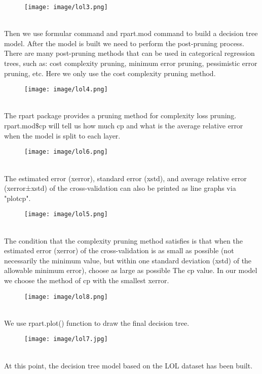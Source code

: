 \documentclass[a4paper,fleqn]{cas-sc}
\begin{document}
\begin{figure}[h!]
	\centering
		\texttt{[image: image/lol3.png]}
	\caption{}
	\label{FIG:1}
\end{figure}\\
Then we use formular command and rpart.mod command to build a decision tree model. After the model is built we need to perform the post-pruning process. There are many post-pruning methods that can be used in categorical regression trees, such as: cost complexity pruning, minimum error pruning, pessimistic error pruning, etc. Here we only use the cost complexity pruning method.\\
\begin{figure}[h!]
	\centering
		\texttt{[image: image/lol4.png]}
	\caption{}
	\label{FIG:1}
\end{figure}\\
The rpart package provides a pruning method for complexity loss pruning. rpart.mod$\$ $cp will tell us how much cp and what is the average relative error when the model is split to each layer. 
\begin{figure}[h!]
	\centering
		\texttt{[image: image/lol6.png]}
	\caption{}
	\label{FIG:1}
\end{figure}\\
The estimated error (xerror), standard error (xstd), and average relative error (xerror±xstd) of the cross-validation can also be printed as line graphs via "plotcp".\\
\begin{figure}[h!]
	\centering
		\texttt{[image: image/lol5.png]}
	\caption{}
	\label{FIG:1}
\end{figure}\\
The condition that the complexity pruning method satisfies is that when the estimated error (xerror) of the cross-validation is as small as possible (not necessarily the minimum value, but within one standard deviation (xstd) of the allowable minimum error), choose as large as possible The cp value. In our model we  choose the method of cp with the smallest xerror.\\
\begin{figure}[h!]
	\centering
		\texttt{[image: image/lol8.png]}
	\caption{}
	\label{FIG:1}
\end{figure}\\
We use rpart.plot() function to draw the final decision tree.\\
\begin{figure}[h!]
	\centering
		\texttt{[image: image/lol7.jpg]}
	\caption{}
	\label{FIG:1}
\end{figure}\\
At this point, the decision tree model based on the LOL dataset has been built.\\
\end{document}
